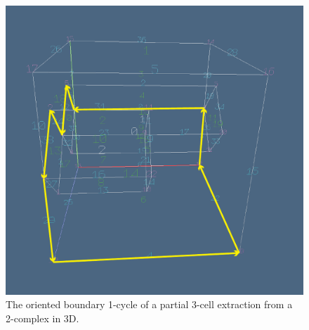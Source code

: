 \documentclass[11pt,oneside]{article}    %
\begin{document}
\begin{figure}[htbp] %
   \centering
   \includegraphics[width=0.5\linewidth]{images/edgecycle} 
   \caption{The oriented boundary 1-cycle of a partial 3-cell extraction from a 2-complex in 3D.}
   \label{fig:edgecycle}
\end{figure}




\end{document}
